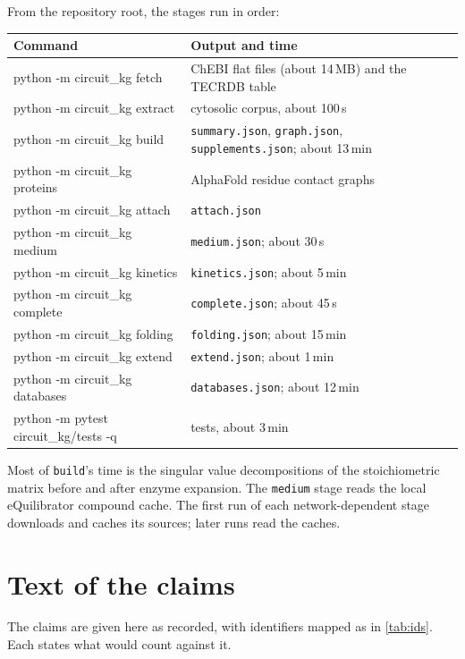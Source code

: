 From the repository root, the stages run in order:
\begin{center}
\begin{tabular}{@{}>{\ttfamily}l>{\raggedright\arraybackslash}p{8.2cm}@{}}
\toprule
\normalfont Command & Output and time \\
\midrule
python -m circuit\_kg fetch & ChEBI flat files (about 14\,MB) and the TECRDB table \\
python -m circuit\_kg extract & cytosolic corpus, about 100\,s \\
python -m circuit\_kg build & \texttt{summary.json}, \texttt{graph.json}, \texttt{supplements.json}; about 13\,min \\
python -m circuit\_kg proteins & AlphaFold residue contact graphs \\
python -m circuit\_kg attach & \texttt{attach.json} \\
python -m circuit\_kg medium & \texttt{medium.json}; about 30\,s \\
python -m circuit\_kg kinetics & \texttt{kinetics.json}; about 5\,min \\
python -m circuit\_kg complete & \texttt{complete.json}; about 45\,s \\
python -m circuit\_kg folding & \texttt{folding.json}; about 15\,min \\
python -m circuit\_kg extend & \texttt{extend.json}; about 1\,min \\
python -m circuit\_kg databases & \texttt{databases.json}; about 12\,min \\
python -m pytest circuit\_kg/tests -q & 53 tests, about 3\,min \\
\bottomrule
\end{tabular}
\end{center}
Most of \texttt{build}'s time is the singular value decompositions of the stoichiometric matrix before and after enzyme expansion.
The \texttt{medium} stage reads the local eQuilibrator compound cache.
The first run of each network-dependent stage downloads and caches its sources; later runs read the caches.

\section{Text of the claims}
\label{app:claims}

The claims are given here as recorded, with identifiers mapped as in \cref{tab:ids}.
Each states what would count against it.

